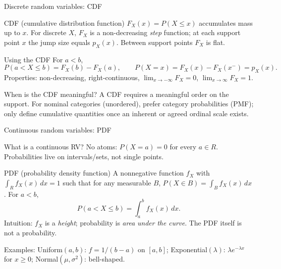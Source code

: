 \documentclass[aspectratio=43]{beamer}
\def\P{P}%
\def\mathbb#1{#1}%
\newcommand{\R}{\mathbb{R}}
\renewcommand{\P}{\mathbb{P}}
\newcommand{\1}{\mathbf{1}}
\begin{document}
\begin{frame}{Discrete random variables: CDF}{}
  {\small
  \begin{block}{CDF (cumulative distribution function)}
    $F_X(x)=\P(X\le x)$ accumulates mass up to $x$. For discrete $X$, $F_X$ is a non-decreasing \emph{step} function; at each support point $x$ the jump size equals $p_X(x)$. Between support points $F_X$ is flat.
  \end{block}
  \vspace{-0.4em}
  \begin{block}{Using the CDF}
    For $a<b$,
    {\scriptsize\[
      \P(a< X\le b)=F_X(b)-F_X(a),\qquad \P(X=x)=F_X(x)-F_X(x^-)=p_X(x).
    \]}
    Properties: non-decreasing, right-continuous, $\lim_{x\to-\infty}F_X=0$, $\lim_{x\to\infty}F_X=1$.
  \end{block}
  \vspace{-0.45em}
  \begin{alertblock}{When is the CDF meaningful?}
    A CDF requires a meaningful order on the support. For nominal categories (unordered), prefer category probabilities (PMF); only define cumulative quantities once an inherent or agreed ordinal scale exists.
  \end{alertblock}
  }
\end{frame}

\begin{frame}{Continuous random variables: PDF}{}
  {\small
  \begin{block}{What is a continuous RV?}
    No atoms: $\P(X=a)=0$ for every $a\in\R$. Probabilities live on intervals/sets, not single points.
  \end{block}
  \vspace{-0.4em}
  \begin{block}{PDF (probability density function)}
    A nonnegative function $f_X$ with $\int_{\R} f_X(x)\,dx=1$ such that for any measurable $B$, $\P(X\in B)=\int_B f_X(x)\,dx$. For $a<b$,
    {\scriptsize\[
      \P(a< X\le b)=\int_a^b f_X(x)\,dx.
    \]}
  Intuition: $f_X$ is a \emph{height}; probability is \emph{area under the curve}. The PDF itself is not a probability.
  \end{block}
  \vspace{-0.35em}
  {\scriptsize Examples: Uniform$(a,b)$: $f=1/(b-a)$ on $[a,b]$; Exponential$(\lambda)$: $\lambda e^{-\lambda x}$ for $x\ge0$; Normal$(\mu,\sigma^2)$: bell-shaped.}
  }
\end{frame}
\end{document}
